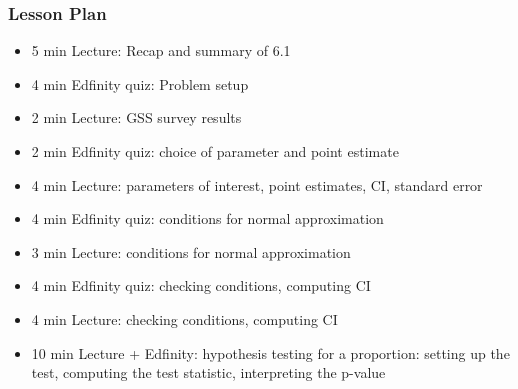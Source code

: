 \begin{frame}
    \frametitle{Lesson Plan}
    \begin{itemize}
        \item 5 min Lecture: Recap and summary of 6.1
        \item 4 min Edfinity quiz: Problem setup
        \item 2 min Lecture: GSS survey results
        \item 2 min Edfinity quiz: choice of parameter and point estimate
        \item 4 min Lecture: parameters of interest, point estimates, CI, standard error
        \item 4 min Edfinity quiz: conditions for normal approximation
        \item 3 min Lecture: conditions for normal approximation
        \item 4 min Edfinity quiz: checking conditions, computing CI
        \item 4 min Lecture: checking conditions, computing CI
        \item 10 min Lecture + Edfinity: hypothesis testing for a proportion: setting up the test, computing the test statistic, interpreting the p-value
    \end{itemize}
\end{frame}
            
    

